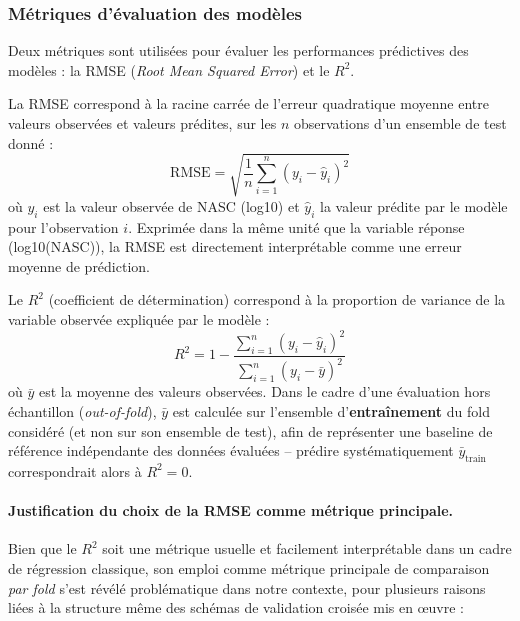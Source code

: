 \documentclass[11pt,a4paper,oneside]{report}
\begin{document}
	\subsubsection{Métriques d'évaluation des modèles}
	Deux métriques sont utilisées pour évaluer les performances prédictives des modèles : la RMSE (\textit{Root Mean Squared Error}) et le $R^2$.
	
	La RMSE correspond à la racine carrée de l'erreur quadratique moyenne entre valeurs observées et valeurs prédites, sur les $n$ observations d'un ensemble de test donné :
	\begin{equation}
		\text{RMSE} = \sqrt{\frac{1}{n} \sum_{i=1}^{n} (y_i - \hat{y}_i)^2}
		\label{eq:rmse}
	\end{equation}
	où $y_i$ est la valeur observée de NASC (log10) et $\hat{y}_i$ la valeur prédite par le modèle pour l'observation $i$. Exprimée dans la même unité que la variable réponse (log10(NASC)), la RMSE est directement interprétable comme une erreur moyenne de prédiction.
	
	Le $R^2$ (coefficient de détermination) correspond à la proportion de variance de la variable observée expliquée par le modèle :
	\begin{equation}
		R^2 = 1 - \frac{\sum_{i=1}^{n} (y_i - \hat{y}_i)^2}{\sum_{i=1}^{n} (y_i - \bar{y})^2}
		\label{eq:r2}
	\end{equation}
	où $\bar{y}$ est la moyenne des valeurs observées. Dans le cadre d'une évaluation hors échantillon (\textit{out-of-fold}), $\bar{y}$ est calculée sur l'ensemble d'\textbf{entraînement} du fold considéré (et non sur son ensemble de test), afin de représenter une baseline de référence indépendante des données évaluées -- prédire systématiquement $\bar{y}_{\text{train}}$ correspondrait alors à $R^2 = 0$.
	
	\paragraph{Justification du choix de la RMSE comme métrique principale.}
	Bien que le $R^2$ soit une métrique usuelle et facilement interprétable dans un cadre de régression classique, son emploi comme métrique principale de comparaison \emph{par fold} s'est révélé problématique dans notre contexte, pour plusieurs raisons liées à la structure même des schémas de validation croisée mis en œuvre :
	
\end{document}
